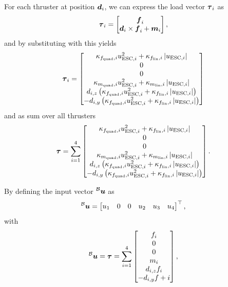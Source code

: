 For each thruster at position $\mbox{$\bm{d}$}_{i}$, we can express the load vector $\mbox{$\bm{\tau}$}_{i}$ as
\begin{equation}
	\label{eq:load-per-thruster-short}
	\mbox{$\bm{\tau}$}_{i} = 
	\begin{bmatrix}
		\mbox{$\bm{f}$}_i \\
		\mbox{$\bm{d}$}_i \times \mbox{$\bm{f}$}_i + \mbox{$\bm{m}$}_i
	\end{bmatrix}
	,
\end{equation}
and by substituting with  this yields
\begin{equation}
	\mbox{$\bm{\tau}$}_{i} = 
	\begin{bmatrix}
		\kappa_{f_{\text{quad}}, i} u_{\text{ESC},i}^2
		+ \kappa_{f_{\text{lin}}, i} \left\lvert u_{\text{ESC},i} \right\rvert
		\\
		0 \\
		0 \\
		\kappa_{m_{\text{quad}}, i} u_{\text{ESC},i}^2
		+ \kappa_{m_{\text{lin}}, i} \left\lvert u_{\text{ESC},i} \right\rvert
		\\
		d_{i,z}
		\left(
			\kappa_{f_{\text{quad}}, i} u_{\text{ESC},i}^2
			+ \kappa_{f_{\text{lin}}, i} \left\lvert u_{\text{ESC},i} \right\rvert
		\right)
		\\
		-d_{i,y}
		\left(
			\kappa_{f_{\text{quad}}, i} u_{\text{ESC},i}^2
			+ \kappa_{f_{\text{lin}}, i} \left\lvert u_{\text{ESC},i} \right\rvert
		\right)
	\end{bmatrix}
\end{equation}
and as sum over all thrusters
\begin{equation}
	\label{eq:thruster-load-vs-uesc}
	\mbox{$\bm{\tau}$} = 
	\sum_{i=1}^{4}
	\begin{bmatrix}
		\kappa_{f_{\text{quad}}, i} u_{\text{ESC},i}^2
		+ \kappa_{f_{\text{lin}}, i} \left\lvert u_{\text{ESC},i} \right\rvert
		\\
		0 \\
		0 \\
		\kappa_{m_{\text{quad}}, i} u_{\text{ESC},i}^2
		+ \kappa_{m_{\text{lin}}, i} \left\lvert u_{\text{ESC},i} \right\rvert
		\\
		d_{i,z}
		\left(
			\kappa_{f_{\text{quad}}, i} u_{\text{ESC},i}^2
			+ \kappa_{f_{\text{lin}}, i} \left\lvert u_{\text{ESC},i} \right\rvert
		\right)
		\\
		-d_{i,y}
		\left(
			\kappa_{f_{\text{quad}}, i} u_{\text{ESC},i}^2
			+ \kappa_{f_{\text{lin}}, i} \left\lvert u_{\text{ESC},i} \right\rvert
		\right)
	\end{bmatrix}
	.
\end{equation}

By defining the input vector $\prescript{\mathcal{B}}{}{\mbox{$\bm{u}$}}$ as
\begin{equation}
	\label{eq:input-vector}
	\prescript{\mathcal{B}}{}{\mbox{$\bm{u}$}} =
	\begin{bmatrix}
		u_1 &
		0 &
		0 &
		u_2 &
		u_3 &
		u_4 
	\end{bmatrix}^\top
	,
\end{equation}
with
\begin{equation}
	\prescript{\mathcal{B}}{}{\mbox{$\bm{u}$}} = \mbox{$\bm{\tau}$} =
	\sum_{i=1}^{4}
	\begin{bmatrix}
		f_i \\
		0 \\
		0 \\
		m_i \\
		d_{i, z} f_i\\
		-d_{i, y} f+i
	\end{bmatrix}
	,
\end{equation}

